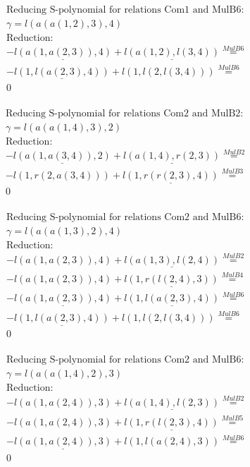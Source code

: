 \documentclass[11pt]{amsart}
\begin{document}
\begin{align*} 
& \text{Reducing S-polynomial for relations Com1 and MulB6:} \\ 
& \gamma = l(a(a(1,2),3),4) \\ 
& \text{Reduction}: \\& - \underline{l(a(1,a(2,3)),4)} + \underline{l(a(1,2),l(3,4))} \stackrel{ MulB6 }{=}  \\ 
& - \underline{l(1,l(a(2,3),4))} + l(1,l(2,l(3,4))) \stackrel{ MulB6 }{=}  \\ 
&0\\ 
\end{align*} 
 
\begin{align*} 
& \text{Reducing S-polynomial for relations Com2 and MulB2:} \\ 
& \gamma = l(a(a(1,4),3),2) \\ 
& \text{Reduction}: \\& - \underline{l(a(1,a(3,4)),2)} + \underline{l(a(1,4),r(2,3))} \stackrel{ MulB2 }{=}  \\ 
& - l(1,r(2,a(3,4))) + \underline{l(1,r(r(2,3),4))} \stackrel{ MulB3 }{=}  \\ 
&0\\ 
\end{align*} 
 
\begin{align*} 
& \text{Reducing S-polynomial for relations Com2 and MulB6:} \\ 
& \gamma = l(a(a(1,3),2),4) \\ 
& \text{Reduction}: \\& - l(a(1,a(2,3)),4) + \underline{l(a(1,3),l(2,4))} \stackrel{ MulB2 }{=}  \\ 
& - l(a(1,a(2,3)),4) + \underline{l(1,r(l(2,4),3))} \stackrel{ MulB4 }{=}  \\ 
& - \underline{l(a(1,a(2,3)),4)} + \underline{l(1,l(a(2,3),4))} \stackrel{ MulB6 }{=}  \\ 
& - \underline{l(1,l(a(2,3),4))} + l(1,l(2,l(3,4))) \stackrel{ MulB6 }{=}  \\ 
&0\\ 
\end{align*} 
 
\begin{align*} 
& \text{Reducing S-polynomial for relations Com2 and MulB6:} \\ 
& \gamma = l(a(a(1,4),2),3) \\ 
& \text{Reduction}: \\& - l(a(1,a(2,4)),3) + \underline{l(a(1,4),l(2,3))} \stackrel{ MulB2 }{=}  \\ 
& - l(a(1,a(2,4)),3) + \underline{l(1,r(l(2,3),4))} \stackrel{ MulB5 }{=}  \\ 
& - \underline{l(a(1,a(2,4)),3)} + l(1,l(a(2,4),3)) \stackrel{ MulB6 }{=}  \\ 
&0\\ 
\end{align*} 
 
\end{document}
